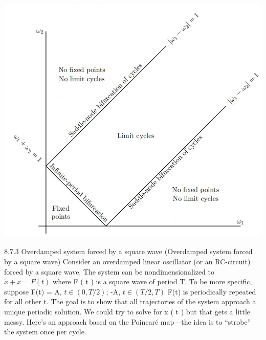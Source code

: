 \documentclass[9pt,aspectratio=43,mathserif,table]{beamer}
\begin{document}
\begin{frame}[label=current]{}
      \includegraphics[width=.3\textwidth]{fig/8.6.1 (3).png}
\end{frame}




\begin{frame}[label=current]{8.7.3 Overdamped system forced by a square wave}
(Overdamped system forced by a square wave) Consider an overdamped
linear oscillator (or an RC-circuit) forced by a square wave. The system can be
nondimensionalized to $\dot x + x = F(t)$ where F ( t ) is a square wave of period T. To
be more specific, suppose F(t) = A, $t\in (0,T/2)$; -A, $t \in (T/2, T)$
 F(t) is periodically repeated for all other t. The goal is to
show that all trajectories of the system approach a unique periodic solution. We
could try to solve for x ( t ) but that gets a little messy. Here’s an approach based on
the Poincaré map—the idea is to “strobe” the system once per cycle.
\end{frame}

















%
%
\end{document}
